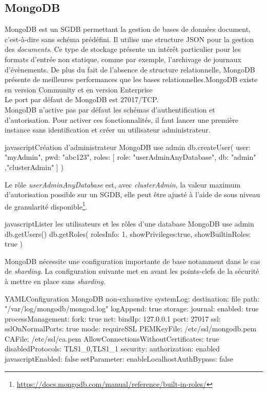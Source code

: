 \documentclass[twoside,a4paper,12pt,titlepage]{book}
\begin{document}
\subsection{MongoDB}
MongoDB est un \gls{SGDB} permettant la gestion de bases de données document, c'est-à-dire sans schéma prédéfini. Il utilise une structure \gls{JSON} pour la gestion des \textit{documents}. Ce type de stockage présente un intérêt particulier pour les formats d'entrée non statique, comme par exemple, l'archivage de journaux d'évènements. De plus du fait de l'absence de structure relationnelle, MongoDB présente de meilleures performances que les bases relationnelles.MongoDB existe en version Community et en version Enterprise\\
Le port par défaut de MongoDB est 27017/TCP.\\
MongoDB n'active pas par défaut les schémas d'authentification et d'autorisation. Pour activer ces fonctionnalités, il faut lancer une première instance sans identification et créer un utilisateur administrateur.
\begin{Config}{javascript}{Création d'administrateur MongoDB}
use admin
db.createUser(
  {
    user: "myAdmin",
    pwd: "abc123",
    roles: [ { role: "userAdminAnyDatabase", db: "admin" },"clusterAdmin" ]
  }
)
\end{Config}
Le rôle \textit{userAdminAnyDatabase} est, avec \textit{clusterAdmin}, la valeur maximum d'autorisation possible sur un SGDB, elle peut être ajusté à l'aide de sous niveau de granularité disponible\footnote{\url{https://docs.mongodb.com/manual/reference/built-in-roles/}}.\\
\begin{Config}{javascript}{Lister les utilisateurs et les rôles d'une database MongoDB}
use admin
db.getUsers()
db.getRoles(
    {
      rolesInfo: 1,
      showPrivileges:true,
      showBuiltinRoles: true
    }
)
\end{Config}
MongoDB nécessite une configuration importante de base notamment dans le cas de \textit{sharding}. La configuration suivante met en avant les points-clefs de la sécurité à mettre en place sans \textit{sharding}.\\ 
\begin{Config}{YAML}{Configuration MongoDB non-exhaustive}
systemLog:
   destination: file
   path: "/var/log/mongodb/mongod.log"
   logAppend: true
storage:
   journal:
      enabled: true
processManagement:
   fork: true
net:
   bindIp: 127.0.0.1
   port: 27017
  ssl:
    sslOnNormalPorts: true
    mode: requireSSL
    PEMKeyFile: /etc/ssl/mongodb.pem
    CAFile: /etc/ssl/ca.pem
    AllowConnectionsWithoutCertificates: true
    disabledProtocols: TLS1_0,TLS1_1
security:
   authorization: enabled
   javascriptEnabled: false
setParameter:
   enableLocalhostAuthBypass: false
\end{Config}
\end{document}
